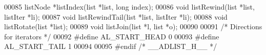 \begin{DoxyCode}
00085 listNode *listIndex(list *list, \textcolor{keywordtype}{long} index);
00086 \textcolor{keywordtype}{void} listRewind(list *list, listIter *li);
00087 \textcolor{keywordtype}{void} listRewindTail(list *list, listIter *li);
00088 \textcolor{keywordtype}{void} listRotate(list *list);
00089 \textcolor{keywordtype}{void} listJoin(list *l, list *o);
00090 
00091 \textcolor{comment}{/* Directions for iterators */}
00092 \textcolor{preprocessor}{#}\textcolor{preprocessor}{define} \textcolor{preprocessor}{AL\_START\_HEAD} 0
00093 \textcolor{preprocessor}{#}\textcolor{preprocessor}{define} \textcolor{preprocessor}{AL\_START\_TAIL} 1
00094 
00095 \textcolor{preprocessor}{#}\textcolor{preprocessor}{endif} \textcolor{comment}{/* \_\_ADLIST\_H\_\_ */}
\end{DoxyCode}
